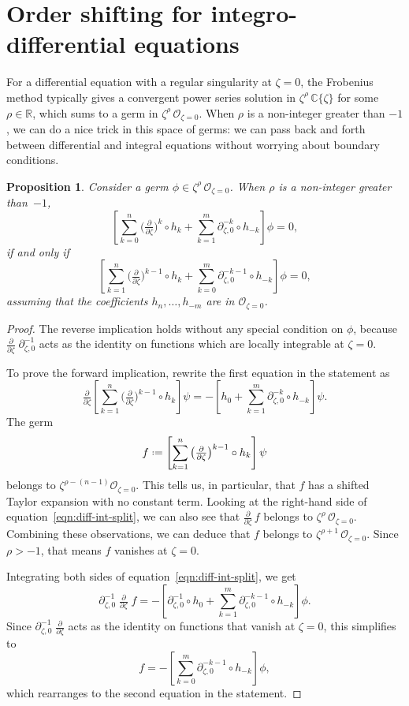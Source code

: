 \documentclass{article}
\newcommand{\R}{\mathbb{R}}
\newcommand{\C}{\mathbb{C}}
\newcommand{\fracderiv}[3]{\partial^{#1}_{#2, #3}}
\newcommand*{\defeq}{\mathrel{\vcenter{\baselineskip0.5ex \lineskiplimit0pt
                     \hbox{\scriptsize.}\hbox{\scriptsize.}}}%
                     =}
\theoremstyle{definition}
\theoremstyle{plain}
\newtheorem{prop}[definition]{Proposition}
\begin{document}
\section{Order shifting for integro-differential equations}\label{shifting}
For a differential equation with a regular singularity at $\zeta = 0$, the Frobenius method typically gives a convergent power series solution in $\zeta^\rho\,\C\{\zeta\}$ for some $\rho \in \R$, which sums to a germ in $\zeta^\rho\,\mathcal{O}_{\zeta=0}$. When $\rho$ is a non-integer greater than $-1$, we can do a nice trick in this space of germs: we can pass back and forth between differential and integral equations without worrying about boundary conditions.
\begin{prop}\label{prop:shifting}
Consider a germ $\phi \in \zeta^\rho\,\mathcal{O}_{\zeta=0}$. When $\rho$ is a non-integer greater than~$-1$,
\[ \left[ \sum_{k = 0}^n \big(\tfrac{\partial}{\partial \zeta}\big)^k \circ h_k + \sum_{k = 1}^m \fracderiv{-k}{\zeta}{0} \circ h_{-k} \right] \phi = 0, \]
if and only if
\[ \left[ \sum_{k = 1}^n \big(\tfrac{\partial}{\partial \zeta}\big)^{k-1} \circ h_k + \sum_{k = 0}^m \fracderiv{-k-1}{\zeta}{0} \circ h_{-k} \right] \phi = 0, \]
assuming that the coefficients $h_n, \ldots, h_{-m}$ are in $\mathcal{O}_{\zeta=0}$.
\end{prop}
\begin{proof}
The reverse implication holds without any special condition on $\phi$, because $\tfrac{\partial}{\partial \zeta}\;\fracderiv{-1}{\zeta}{0}$ acts as the identity on functions which are locally integrable at $\zeta = 0$.

To prove the forward implication, rewrite the first equation in the statement as
\begin{equation}\label{eqn:diff-int-split}
\tfrac{\partial}{\partial \zeta} \left[ \sum_{k = 1}^n \big(\tfrac{\partial}{\partial \zeta}\big)^{k-1} \circ h_k \right] \psi = -\left[ h_0 + \sum_{k = 1}^m \fracderiv{-k}{\zeta}{0} \circ h_{-k} \right] \psi.
\end{equation}
The germ
\[ f \defeq \left[ \sum_{k = 1}^n \big(\tfrac{\partial}{\partial \zeta}\big)^{k-1} \circ h_k \right] \psi \]
belongs to $\zeta^{\rho-(n-1)} \mathcal{O}_{\zeta = 0}$. This tells us, in particular, that $f$ has a shifted Taylor expansion with no constant term. Looking at the right-hand side of equation~\eqref{eqn:diff-int-split}, we can also see that $\tfrac{\partial}{\partial \zeta}\,f$ belongs to $\zeta^\rho\,\mathcal{O}_{\zeta=0}$. Combining these observations, we can deduce that $f$ belongs to $\zeta^{\rho+1}\,\mathcal{O}_{\zeta=0}$. Since $\rho > -1$, that means $f$ vanishes at $\zeta = 0$.

Integrating both sides of equation~\eqref{eqn:diff-int-split}, we get
\[ \fracderiv{-1}{\zeta}{0}\;\tfrac{\partial}{\partial \zeta}\;f = -\left[ \fracderiv{-1}{\zeta}{0} \circ h_0 + \sum_{k = 1}^m \fracderiv{-k-1}{\zeta}{0} \circ h_{-k} \right] \phi. \]
Since $\fracderiv{-1}{\zeta}{0}\;\tfrac{\partial}{\partial \zeta}$ acts as the identity on functions that vanish at $\zeta = 0$, this simplifies to
\[ f = -\left[ \sum_{k = 0}^m \fracderiv{-k-1}{\zeta}{0} \circ h_{-k} \right] \phi, \]
which rearranges to the second equation in the statement.
\end{proof}
\newpage


\end{document}
